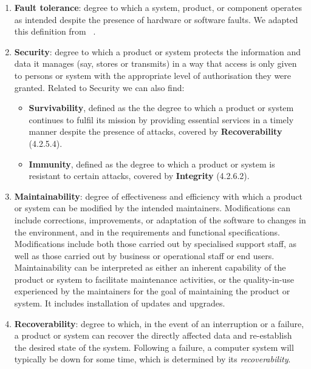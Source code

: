 \begin{enumerate}
    \item \textbf{Fault tolerance}: degree to which a system, product, or component operates as intended despite the presence of hardware or software faults. We adapted this definition from ~\cite{iso_central_secretary_isoiecieee_2010}.

    \item \textbf{Security}: degree to which a product or system protects the information and data it manages (say, stores or transmits) in a way that access is only given to persons or system with the appropriate level of authorisation they were granted.
    Related to Security we can also find:
    \begin{itemize}
        \item \textbf{Survivability}, defined as the the degree to which a product or system continues to fulfil its mission by providing essential services in a timely manner despite the presence of attacks, covered by \textbf{Recoverability} (4.2.5.4).
        \item \textbf{Immunity}, defined as the degree to which a product or system is resistant to certain attacks, covered by \textbf{Integrity} (4.2.6.2).
    \end{itemize}

    \item \textbf{Maintainability}: degree of effectiveness and efficiency with which a product or system can be modified by the intended maintainers. Modifications can include corrections, improvements, or adaptation of the software to changes in the environment, and in the requirements and functional specifications. Modifications include both those carried out by specialised support staff, as well as those carried out by business or operational staff or end users. Maintainability can be interpreted as either an inherent capability of the product or system to facilitate maintenance activities, or the quality-in-use experienced by the maintainers for the goal of maintaining the product or system. It includes installation of updates and upgrades. 

    \item \textbf{Recoverability}: degree to which, in the event of an interruption or a failure, a product or system can recover the directly affected data and re-establish the desired state of the system. Following a failure, a computer system will typically be down for some time, which is determined by its \textit{recoverability}.


\end{enumerate}
